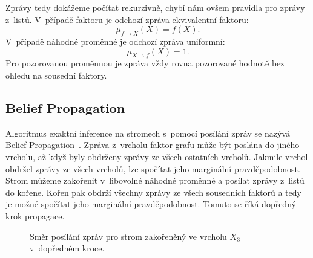 Zprávy tedy dokážeme počítat rekurzivně, chybí nám ovšem pravidla pro zprávy z~listů.
V~případě faktoru je odchozí zpráva ekvivalentní faktoru:
\begin{equation}
    \mu_{f \rightarrow X}(X) = f(X).
\end{equation}
V~případě náhodné proměnné je odchozí zpráva uniformní:
\begin{equation}
    \mu_{X \rightarrow f}(X) = 1.
\end{equation}
Pro pozorovanou proměnnou je zpráva vždy rovna pozorované hodnotě bez ohledu na sousední faktory.

\subsection{Belief Propagation}

Algoritmus exaktní inference na stromech s~pomocí posílání zpráv se nazývá Belief Propagation~\cite{pearl1988probabilistic}.
Zpráva z~vrcholu faktor grafu může být poslána do jiného vrcholu, až když byly obdrženy zprávy ze všech ostatních vrcholů.
Jakmile vrchol obdržel zprávy ze všech vrcholů, lze spočítat jeho marginální pravděpodobnost.
Strom můžeme zakořenit v~libovolné náhodné proměnné a posílat zprávy z~listů do kořene.
Kořen pak obdrží všechny zprávy ze všech sousedních faktorů a tedy je možné spočítat jeho marginální pravděpodobnost.
Tomuto se říká dopředný krok propagace.

\begin{figure}[H]
\begin{center}
\end{center}
\caption{Směr posílání zpráv pro strom zakořeněný ve vrcholu $X_3$ v~dopředném kroce.}
\end{figure}

